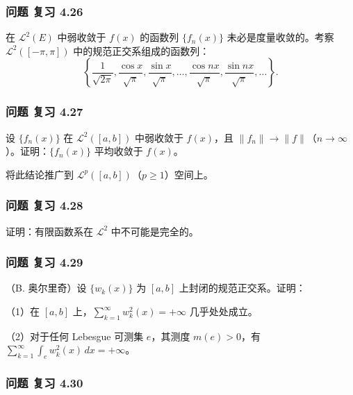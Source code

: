 \documentclass[11pt,a4paper]{article}
\begin{document}
\subsubsection{问题 复习 4.26}\label{ch04-practice-ux95eeux9898-ux590dux4e60-4.26}

在 \(\mathcal L^2(E)\) 中弱收敛于 \(f(x)\) 的函数列 \(\{f_n(x)\}\)
未必是度量收敛的。考察 \(\mathcal L^2([-\pi,\pi])\)
中的规范正交系组成的函数列： \[
\left\{\frac1{\sqrt{2\pi}},\frac{\cos x}{\sqrt\pi},\frac{\sin x}{\sqrt\pi},\ldots,
\frac{\cos nx}{\sqrt\pi},\frac{\sin nx}{\sqrt\pi},\ldots\right\}.
\]

\subsubsection{问题 复习 4.27}\label{ch04-practice-ux95eeux9898-ux590dux4e60-4.27}

设 \(\{f_n(x)\}\) 在 \(\mathcal L^2([a,b])\) 中弱收敛于 \(f(x)\)，且
\(\|f_n\|\to\|f\|\)（\(n\to\infty\)）。证明：\(\{f_n(x)\}\) 平均收敛于
\(f(x)\)。

将此结论推广到 \(\mathcal L^p([a,b])\)（\(p\ge1\)）空间上。

\subsubsection{问题 复习 4.28}\label{ch04-practice-ux95eeux9898-ux590dux4e60-4.28}

证明：有限函数系在 \(\mathcal L^2\) 中不可能是完全的。

\subsubsection{问题 复习 4.29}\label{ch04-practice-ux95eeux9898-ux590dux4e60-4.29}

（B. 奥尔里奇）设 \(\{w_k(x)\}\) 为 \([a,b]\) 上封闭的规范正交系。证明：

（1）在 \([a,b]\) 上，\(\sum_{k=1}^\infty w_k^2(x)=+\infty\)
几乎处处成立。

（2）对于任何 Lebesgue 可测集 \(e\)，其测度 \(m(e)>0\)，有
\(\sum_{k=1}^\infty\int_e w_k^2(x)\,dx=+\infty\)。

\subsubsection{问题 复习 4.30}\label{ch04-practice-ux95eeux9898-ux590dux4e60-4.30}
\end{document}
